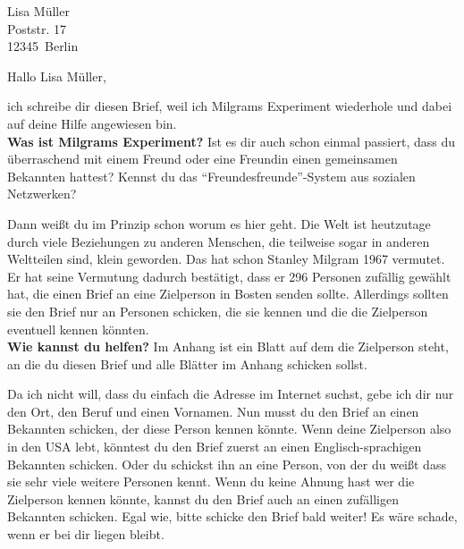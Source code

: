 \documentclass[a4paper, 12pt, KOMAold, sections]{scrlttr2}
\newcommand{\Empfaenger}{Lisa Müller} %
\newcommand{\EStrasse}{Poststr. 17}   %
\newcommand{\EPLZ}{12345}             %
\newcommand{\EOrt}{Berlin}            %
\newcommand{\DocTitle}{Milgrams Small World Experiment} %
\newcommand{\section}[1]{\noindent\textbf{#1}\newline}
\begin{document}
    \begin{letter}{\Empfaenger \\ \EStrasse \\ \EPLZ~\EOrt}
    \date{\today}%
    \subject{\DocTitle}
    \opening{Hallo \Empfaenger,}
    ich schreibe dir diesen Brief, weil ich Milgrams Experiment wiederhole und
    dabei auf deine Hilfe angewiesen bin.\\

    \section{Was ist Milgrams Experiment?}
    Ist es dir auch schon einmal passiert, dass du überraschend mit einem Freund
    oder eine Freundin einen gemeinsamen Bekannten hattest? Kennst du
    das "`Freundesfreunde"'-System aus sozialen Netzwerken?

    Dann weißt du im Prinzip schon worum es hier geht. Die Welt ist heutzutage
    durch viele Beziehungen zu anderen Menschen, die teilweise sogar in anderen
    Weltteilen sind, klein geworden. Das hat schon Stanley Milgram 1967 vermutet.
    Er hat seine Vermutung dadurch bestätigt, dass er 296  Personen zufällig
    gewählt hat, die einen Brief an eine Zielperson in Bosten senden sollte.
    Allerdings sollten sie den Brief nur an Personen schicken, die sie kennen
    und die die Zielperson eventuell kennen könnten.\\

    \section{Wie kannst du helfen?}
    Im Anhang ist ein Blatt auf dem die Zielperson steht, an die du diesen Brief
    und alle Blätter im Anhang schicken sollst.

    Da ich nicht will, dass du einfach die Adresse im Internet
    suchst, gebe ich dir nur den Ort, den Beruf und einen Vornamen. Nun musst
    du den Brief an einen Bekannten schicken, der diese Person kennen könnte.
    Wenn deine Zielperson also in den USA lebt, könntest du den Brief zuerst
    an einen Englisch-sprachigen Bekannten schicken. Oder du schickst ihn an
    eine Person, von der du weißt dass sie sehr viele weitere Personen kennt.
    Wenn du keine Ahnung hast wer die Zielperson kennen könnte, kannst du den
    Brief auch an einen zufälligen Bekannten schicken. Egal wie, bitte schicke
    den Brief bald weiter! Es wäre schade, wenn er bei dir liegen bleibt.\\


\end{letter}
\end{document}
